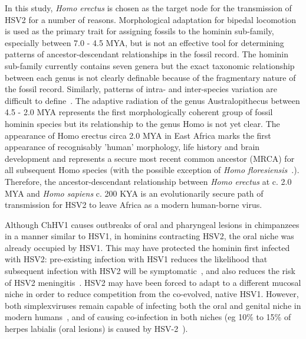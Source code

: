\documentclass[fleqn,10pt]{wlscirep}
\begin{document}
In this study, \textit{Homo erectus} is chosen as the target node for the transmission of HSV2 for a number of reasons. Morphological adaptation for bipedal locomotion is used as the primary trait for assigning fossils to the hominin sub-family, especially between 7.0 - 4.5 MYA, but is not an effective tool for determining patterns of ancestor-descendant relationships in the fossil record. The hominin sub-family currently contains seven genera but the exact taxonomic relationship between each genus is not clearly definable because of the fragmentary nature of the fossil record. Similarly, patterns of intra- and inter-species variation are difficult to define~\citep{Foley2016}.  The adaptive radiation of the genus Australopithecus between 4.5 - 2.0 MYA represents the first morphologically coherent group of fossil hominin species but its relationship to the genus Homo is not yet clear. The appearance of Homo erectus circa 2.0 MYA in East Africa marks the first appearance of recognisably 'human' morphology, life history and brain development and represents a secure most recent common ancestor (MRCA) for all subsequent Homo species (with the possible exception of \textit{Homo floresiensis}~\citep{Argue2017, Anton2016}.). Therefore, the ancestor-descendant relationship between \textit{Homo erectus} at c. 2.0 MYA and \textit{Homo sapiens} c. 200 KYA is an evolutionarily secure path of transmission for HSV2 to leave Africa as a modern human-borne virus.

Although ChHV1 causes outbreaks of oral and pharyngeal lesions in chimpanzees in a manner similar to HSV1, in hominins contracting HSV2, the oral niche was already occupied by HSV1. This may have protected the hominin first infected with HSV2: pre-existing infection with HSV1 reduces the likelihood that subsequent infection with HSV2 will be symptomatic~\citep{Langenberg1999}, and also reduces the risk of HSV2 meningitis~\citep{Aurelius2012}. HSV2 may have been forced to adapt to a different mucosal niche in order to reduce competition from the co-evolved, native HSV1. However, both simplexviruses remain capable of infecting both the oral and genital niche in modern humans~\citep{Kim2006,Whitley2007}, and of causing co-infection in both niches (eg 10\% to 15\% of herpes labialis (oral lesions) is caused by HSV-2~\citep{Glick1999}).
\end{document}
